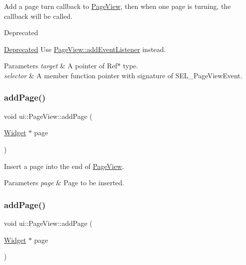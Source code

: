 Add a page turn callback to \hyperlink{classui_1_1PageView}{Page\+View}, then when one page is turning, the callback will be called. \begin{DoxyRefDesc}{Deprecated}
\item[\hyperlink{deprecated__deprecated000385}{Deprecated}]Use {\ttfamily \hyperlink{classui_1_1PageView_a8887593dc71c203af06f8043082d2de4}{Page\+View\+::add\+Event\+Listener}} instead. \end{DoxyRefDesc}

\begin{DoxyParams}{Parameters}
{\em target} & A pointer of {\ttfamily Ref$\ast$} type. \\
\hline
{\em selector} & A member function pointer with signature of {\ttfamily S\+E\+L\+\_\+\+Page\+View\+Event}. \\
\hline
\end{DoxyParams}
\mbox{\label{classui_1_1PageView_afc6dc3519137860e93f4e777dc172874}} 
\subsubsection{\texorpdfstring{add\+Page()}{addPage()}\hspace{0.1cm}{\footnotesize\ttfamily [1/2]}}
{\footnotesize\ttfamily void ui\+::\+Page\+View\+::add\+Page (\begin{DoxyParamCaption}\item[{\hyperlink{classui_1_1Widget}{Widget} $\ast$}]{page }\end{DoxyParamCaption})}

Insert a page into the end of \hyperlink{classui_1_1PageView}{Page\+View}.


\begin{DoxyParams}{Parameters}
{\em page} & Page to be inserted. \\
\hline
\end{DoxyParams}
\mbox{\label{classui_1_1PageView_afc6dc3519137860e93f4e777dc172874}} 
\subsubsection{\texorpdfstring{add\+Page()}{addPage()}\hspace{0.1cm}{\footnotesize\ttfamily [2/2]}}
{\footnotesize\ttfamily void ui\+::\+Page\+View\+::add\+Page (\begin{DoxyParamCaption}\item[{\hyperlink{classui_1_1Widget}{Widget} $\ast$}]{page }\end{DoxyParamCaption})}


